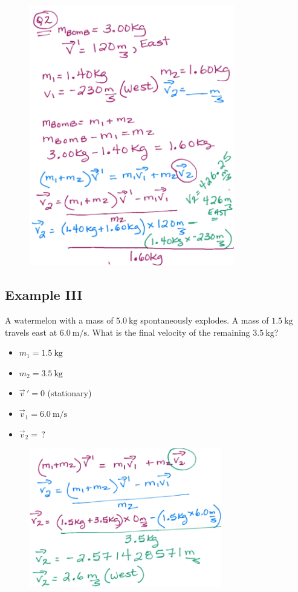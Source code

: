 \documentclass[a4paper,12pt]{article}
\begin{document}
\begin{figure}[H]
    \centering
    \includegraphics[width=0.8\textwidth]{q-explode-2}
\end{figure}

\pagebreak

\subsection{Example III}
A watermelon with a mass of $\SI{5.0}{\kg}$ spontaneously explodes. A mass of $\SI{1.5}{\kg}$ travels east at $\SI{6.0}{\m\per\s}$. What is the final velocity of the remaining $\SI{3.5}{\kg}$? 

\begin{itemize}
    \item{$m_1 = \SI{1.5}{\kg}$}
    \item{$m_2 = \SI{3.5}{\kg}$}
    \item{$\vec{v}\,' = 0$ (stationary)}
    \item{$\vec{v}_1 = \SI{6.0}{\m\per\s}$}
    \item{$\vec{v}_2 = \,?$}
\end{itemize}

\begin{figure}[H]
    \centering
    \includegraphics[width=0.75\textwidth]{q-explode-3a}
\end{figure}
\end{document}
